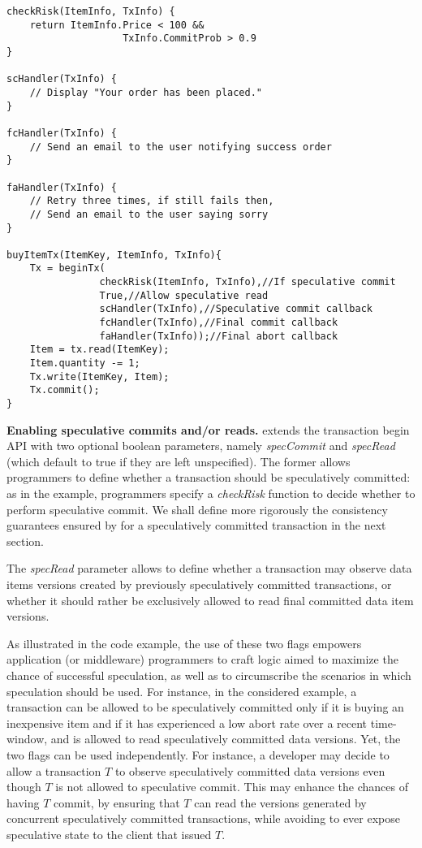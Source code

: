 \begin{lstlisting}[caption=Example transaction that buys an item]   
checkRisk(ItemInfo, TxInfo) { 
    return ItemInfo.Price < 100 &&
                    TxInfo.CommitProb > 0.9
}

scHandler(TxInfo) {
    // Display "Your order has been placed."
}

fcHandler(TxInfo) {
    // Send an email to the user notifying success order
}

faHandler(TxInfo) {
    // Retry three times, if still fails then,
    // Send an email to the user saying sorry
}

buyItemTx(ItemKey, ItemInfo, TxInfo){
    Tx = beginTx(
                checkRisk(ItemInfo, TxInfo),//If speculative commit
                True,//Allow speculative read
                scHandler(TxInfo),//Speculative commit callback
                fcHandler(TxInfo),//Final commit callback
                faHandler(TxInfo));//Final abort callback
    Item = tx.read(ItemKey);
    Item.quantity -= 1;
    Tx.write(ItemKey, Item);
    Tx.commit();
}
\end{lstlisting}

{\bf Enabling speculative commits and/or reads.} \specula extends the transaction begin API with two optional boolean parameters, namely \textit{specCommit} and \textit{specRead} (which default to true if they are left unspecified). The former allows programmers to define whether a transaction should be speculatively committed: as in the example, programmers specify a \textit{checkRisk} function to decide whether to perform speculative commit. We shall define more rigorously the consistency guarantees ensured by \specula for a speculatively committed transaction in the next section. 
\iffalse
Yet, in a nutshell, a speculatively committed transaction is guaranteed to have executed respecting the SI semantics for a history comprising all final committed transactions and locally originated speculatively committed transactions.
\fi

The \textit{specRead} parameter allows to define whether a transaction may observe data items versions created by previously speculatively committed transactions, or whether it should rather be exclusively allowed to read final committed data item versions.

As illustrated in the code example, the use of these two flags empowers application (or middleware) programmers to craft logic aimed to maximize the chance of successful speculation, as well as to circumscribe the scenarios in which speculation should be used. For instance, in the considered example, a transaction can be allowed to be speculatively committed only if it is buying an inexpensive item and if it has experienced a low abort rate over a recent time-window, and is allowed to read speculatively committed data versions. Yet, the two flags can be used independently. For instance, a developer may decide to allow a transaction $T$ to observe speculatively committed data versions even though $T$ is not allowed to speculative commit. This may enhance the chances of having $T$ commit, by ensuring that $T$ can read the versions generated by concurrent speculatively committed transactions, while avoiding to ever expose speculative state to the client that issued $T$.

